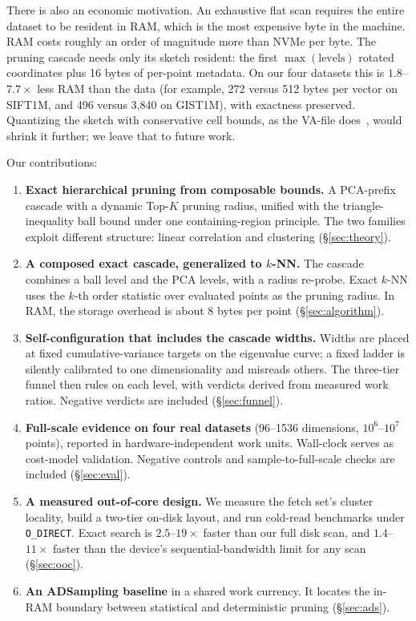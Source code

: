 \documentclass[sigconf, nonacm]{acmart}
\begin{document}
There is also an economic motivation. An exhaustive flat scan requires the
entire dataset to be resident in RAM, which is the most expensive byte in
the machine. RAM costs roughly an order of magnitude more than NVMe per
byte. The pruning cascade needs only its sketch resident: the first
$\max(\mathrm{levels})$ rotated coordinates plus 16 bytes of per-point
metadata. On our four datasets this is $1.8$--$7.7\times$ less RAM than
the data (for example, 272 versus 512 bytes per vector on SIFT1M, and 496
versus 3{,}840 on GIST1M), with exactness preserved. Quantizing the sketch
with conservative cell bounds, as the VA-file does~\cite{vafile}, would
shrink it further; we leave that to future work.

Our contributions:
\begin{enumerate}
\item \textbf{Exact hierarchical pruning from composable bounds.} A
  PCA-prefix cascade with a dynamic Top-$K$ pruning radius, unified with
  the triangle-inequality ball bound under one containing-region
  principle. The two families exploit different structure: linear
  correlation and clustering (\S\ref{sec:theory}).
\item \textbf{A composed exact cascade, generalized to $k$-NN.} The
  cascade combines a ball level and the PCA levels, with a radius
  re-probe. Exact $k$-NN uses the $k$-th order statistic over evaluated
  points as the pruning radius. In RAM, the storage overhead is about 8
  bytes per point (\S\ref{sec:algorithm}).
\item \textbf{Self-configuration that includes the cascade widths.}
  Widths are placed at fixed cumulative-variance targets on the
  eigenvalue curve; a fixed ladder is silently calibrated to one
  dimensionality and misreads others. The three-tier funnel then rules
  on each level, with verdicts derived from measured work ratios.
  Negative verdicts are included (\S\ref{sec:funnel}).
\item \textbf{Full-scale evidence on four real datasets} (96--1536
  dimensions, $10^6$--$10^7$ points), reported in hardware-independent
  work units. Wall-clock serves as cost-model validation. Negative
  controls and sample-to-full-scale checks are included
  (\S\ref{sec:eval}).
\item \textbf{A measured out-of-core design.} We measure the fetch set's
  cluster locality, build a two-tier on-disk layout, and run cold-read
  benchmarks under \texttt{O\_DIRECT}. Exact search is $2.5$--$19\times$
  faster than our full disk scan, and $1.4$--$11\times$ faster than the
  device's sequential-bandwidth limit for any scan (\S\ref{sec:ooc}).
\item \textbf{An ADSampling baseline} in a shared work currency. It
  locates the in-RAM boundary between statistical and deterministic
  pruning (\S\ref{sec:ads}).
\end{enumerate}
\end{document}
